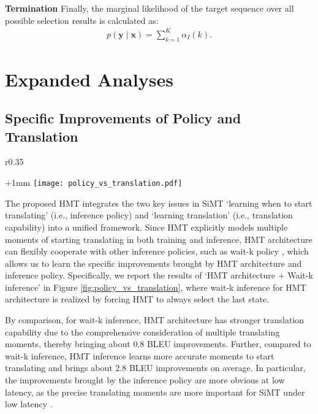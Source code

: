 \documentclass{article} %
\begin{document}
\textbf{Termination} Finally, the marginal likelihood of the target sequence over all possible selection results is calculated as:
\begin{gather}
    p\!\left ( \mathbf{y}\mid \mathbf{x} \right )= \sum_{k=1}^{K} \alpha_{I}\left(k\right).
\end{gather}

\section{Expanded Analyses}

\subsection{Specific Improvements of Policy and Translation}

\setlength{\columnsep}{12pt}
\begin{wrapfigure}{r}{0.35\textwidth}
\begin{center}
\advance\leftskip+1mm
  \vspace{-0.25in} 
 \texttt{[image: policy\_vs\_translation.pdf]}
   \vspace{-0.1in} 
  \caption{Specific improvements brought by HMT architecture and inference policy.}\label{fig:policy_vs_translation}
\vspace{-0.2in} 
\end{center}
\end{wrapfigure}
The proposed HMT integrates the two key issues in SiMT `learning when to start translating' (i.e., inference policy) and `learning translation' (i.e., translation capability) into a unified framework. Since HMT explicitly models multiple moments of starting translating in both training and inference, HMT architecture can flexibly cooperate with other inference policies, such as wait-k policy \citep{ma-etal-2019-stacl}, which allows us to learn the specific improvements brought by HMT architecture and inference policy. Specifically, we report the results of `HMT architecture + Wait-k inference' in Figure \ref{fig:policy_vs_translation}, where wait-k inference for HMT architecture is realized by forcing HMT to always select the last state. 

By comparison, for wait-k inference, HMT architecture has stronger translation capability due to the comprehensive consideration of multiple translating moments, thereby bringing about 0.8 BLEU improvements. Further, compared to wait-k inference, HMT inference learns more accurate moments to start translating and brings about 2.8 BLEU improvements on average. In particular, the improvements brought by the inference policy are more obvious at low latency, as the precise translating moments are more important for SiMT under low latency \citep{Arivazhagan2019}.
\end{document}
